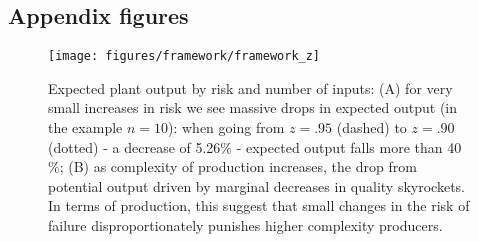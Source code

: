 \documentclass[11pt]{article}
\begin{document}
\begin{appendices}


\subsection{Appendix figures}%
\label{sub:appendix_figs}

\begin{figure}[htpb]
	\centering
	\texttt{[image: figures/framework/framework\_z]}
	\caption{Expected plant output by risk and number of inputs: (A) for very small increases in risk we see massive drops in expected output (in the example \(n = 10\)): when going from \(z = .95\) (dashed) to \(z = .90\) (dotted) - a decrease of 5.26\% - expected output falls more than 40 \%; (B) as complexity of production increases, the drop from potential output driven by marginal decreases in quality skyrockets. In terms of production, this suggest that small changes in the risk of failure disproportionately punishes higher complexity producers.}%
	\label{fig:framework-z}
\end{figure}


\newpage 
\end{appendices}
\end{document}
